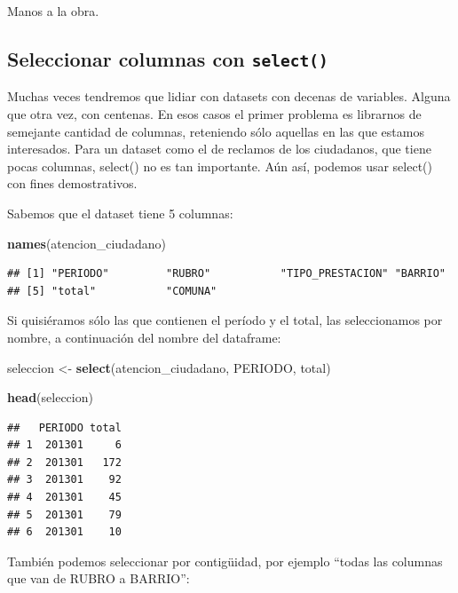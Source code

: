 \documentclass[spanish,]{book}
\newenvironment{Shaded}{\begin{snugshade}}{\end{snugshade}}
\newcommand{\KeywordTok}[1]{\textcolor[rgb]{0.13,0.29,0.53}{\textbf{#1}}}
\newcommand{\NormalTok}[1]{#1}
\newcommand{\StringTok}[1]{\textcolor[rgb]{0.31,0.60,0.02}{#1}}
\begin{document}
Manos a la obra.

\hypertarget{seleccionar-columnas-con-select}{%
\subsection{\texorpdfstring{Seleccionar columnas con \texttt{select()}}{Seleccionar columnas con select()}}\label{seleccionar-columnas-con-select}}

Muchas veces tendremos que lidiar con datasets con decenas de variables. Alguna que otra vez, con centenas. En esos casos el primer problema es librarnos de semejante cantidad de columnas, reteniendo sólo aquellas en las que estamos interesados. Para un dataset como el de reclamos de los ciudadanos, que tiene pocas columnas, select() no es tan importante. Aún así, podemos usar select() con fines demostrativos.

Sabemos que el dataset tiene 5 columnas:

\begin{Shaded}
\begin{Highlighting}[]
\KeywordTok{names}\NormalTok{(atencion_ciudadano)}
\end{Highlighting}
\end{Shaded}

\begin{verbatim}
## [1] "PERIODO"         "RUBRO"           "TIPO_PRESTACION" "BARRIO"         
## [5] "total"           "COMUNA"
\end{verbatim}

Si quisiéramos sólo las que contienen el período y el total, las seleccionamos por nombre, a continuación del nombre del dataframe:

\begin{Shaded}
\begin{Highlighting}[]
\NormalTok{seleccion <-}\StringTok{ }\KeywordTok{select}\NormalTok{(atencion_ciudadano, PERIODO, total)}

\KeywordTok{head}\NormalTok{(seleccion)}
\end{Highlighting}
\end{Shaded}

\begin{verbatim}
##   PERIODO total
## 1  201301     6
## 2  201301   172
## 3  201301    92
## 4  201301    45
## 5  201301    79
## 6  201301    10
\end{verbatim}

También podemos seleccionar por contigüidad, por ejemplo ``todas las columnas que van de RUBRO a BARRIO'':
\end{document}
